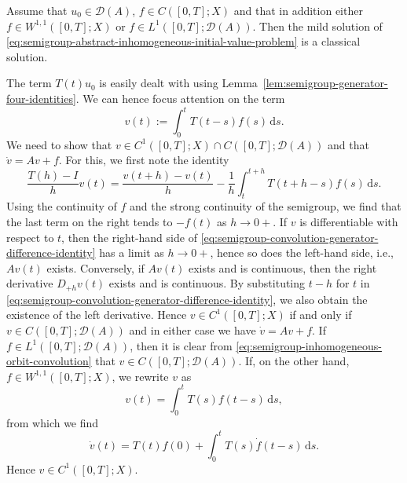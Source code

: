 \begin{Theorem}
\label{thm:semigroup-mild-solution-classical-regularity}
Assume that $u_0\in\mathcal{D}(A)$, $f\in C([0,T];X)$ and that in addition either $f\in W^{1,1}([0,T];X)$ or $f\in L^1([0,T];\mathcal{D}(A))$. Then the mild solution of \eqref{eq:semigroup-abstract-inhomogeneous-initial-value-problem} is a classical solution.
\end{Theorem}

\begin{Proof}
The term $T(t)u_0$ is easily dealt with using Lemma~\ref{lem:semigroup-generator-four-identities}. We can hence focus attention on the term
\begin{equation}\label{eq:semigroup-inhomogeneous-orbit-convolution}
v(t):=\int_0^t T(t-s)f(s)\,\mathrm{d}s.
\end{equation}
We need to show that $v\in C^1([0,T];X)\cap C([0,T];\mathcal{D}(A))$ and that $\dot v=Av+f$. For this, we first note the identity
\begin{equation}\label{eq:semigroup-convolution-generator-difference-identity}
\dfrac{T(h)-I}{h}v(t)=\dfrac{v(t+h)-v(t)}{h}-\dfrac{1}{h}\int_t^{t+h}T(t+h-s)f(s)\,\mathrm{d}s.
\end{equation}
Using the continuity of $f$ and the strong continuity of the semigroup, we find that the last term on the right tends to $-f(t)$ as $h\to0+$. If $v$ is differentiable with respect to $t$, then the right-hand side of \eqref{eq:semigroup-convolution-generator-difference-identity} has a limit as $h\to0+$, hence so does the left-hand side, i.e., $Av(t)$ exists. Conversely, if $Av(t)$ exists and is continuous, then the right derivative $D_{+h}v(t)$ exists and is continuous. By substituting $t-h$ for $t$ in \eqref{eq:semigroup-convolution-generator-difference-identity}, we also obtain the existence of the left derivative. Hence $v\in C^1([0,T];X)$ if and only if $v\in C([0,T];\mathcal{D}(A))$ and in either case we have $\dot v=Av+f$. If $f\in L^1([0,T];\mathcal{D}(A))$, then it is clear from \eqref{eq:semigroup-inhomogeneous-orbit-convolution} that $v\in C([0,T];\mathcal{D}(A))$. If, on the other hand, $f\in W^{1,1}([0,T];X)$, we rewrite $v$ as
\begin{equation}\label{eq:semigroup-convolution-time-variable-reversal}
v(t)=\int_0^t T(s)f(t-s)\,\mathrm{d}s,
\end{equation}
from which we find
\begin{equation}\label{eq:semigroup-convolution-with-differentiable-data}
\dot v(t)=T(t)f(0)+\int_0^t T(s)\dot f(t-s)\,\mathrm{d}s.
\end{equation}
Hence $v\in C^1([0,T];X)$.
\end{Proof}

